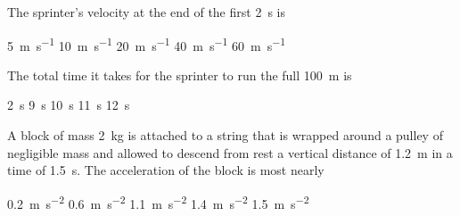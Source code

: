 \documentclass{../../../oss-ap12ibhl}
\begin{document}
\begin{questions}
  
  \question The sprinter's velocity at the end of the first \SI{2}{\second} is

  \begin{oneparchoices}
    \choice\SI{5 }{\metre\per\second}\hspace{.27in}
    \choice\SI{10}{\metre\per\second}\hspace{.27in}
    \choice\SI{20}{\metre\per\second}\hspace{.27in}
    \choice\SI{40}{\metre\per\second}\hspace{.27in}
    \choice\SI{60}{\metre\per\second}
  \end{oneparchoices}
  \label{q:sprinter1}
  \vspace{.3in}
  
  \question The total time it takes for the sprinter to run the full
  \SI{100}{\metre} is
  
  \begin{oneparchoices}
    \choice\SI{2}{\second}\hspace{.5in}
    \choice\SI{9}{\second}\hspace{.5in}
    \choice\SI{10}{\second}\hspace{.5in}
    \choice\SI{11}{\second}\hspace{.5in}
    \choice\SI{12}{\second}
  \end{oneparchoices}
  \label{q:sprinter2}
  \vspace{.3in}

  \uplevel{\rule{\linewidth}{.6pt}}
  
  \question A block of mass \SI{2}{\kilo\gram} is attached to a string that is
  wrapped around a pulley of negligible mass and allowed to descend from rest
  a vertical distance of \SI{1.2}{\metre} in a time of \SI{1.5}{\second}. The
  acceleration of the block is most nearly

  \begin{minipage}{.28\linewidth}
  \end{minipage}
  \begin{minipage}{.3\linewidth}
    \begin{choices}
      \choice\SI{.2}{\metre\per\second\squared}
      \choice\SI{.6}{\metre\per\second\squared}
      \choice\SI{1.1}{\metre\per\second\squared}
      \choice\SI{1.4}{\metre\per\second\squared}
      \choice\SI{1.5}{\metre\per\second\squared}
    \end{choices}
  \end{minipage}
  

\end{questions}
\end{document}
